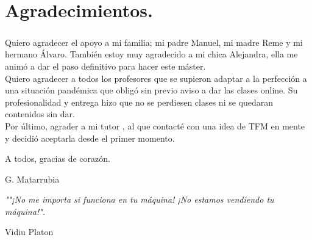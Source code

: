 \chapter{Agradecimientos.}\label{sec:agradecimientos}

\paragraph{}Quiero agradecer el apoyo a mi familia; mi padre Manuel, mi madre Reme y mi hermano Álvaro.
También estoy muy agradecido a mi chica Alejandra, ella me animó a dar el paso definitivo para hacer este
máster. \\
Quiero agradecer a todos los profesores que se supieron adaptar a la perfección a una situación
pandémica que obligó sin previo aviso a dar las clases online. Su profesionalidad y entrega hizo que no
se perdiesen clases ni se quedaran contenidos sin dar. \\
Por último, agrader a mi tutor \TUTOR, al que contacté con una idea de TFM en mente y decidió
aceptarla desde el primer momento.

A todos, gracias de corazón.


\begin{flushright}
G. Matarrubia
\end{flushright}

%
\vspace*{\fill}

\emph{""¡No me importa si funciona en tu máquina! ¡No estamos vendiendo tu máquina!".}

\begin{flushright}
	Vidiu Platon
\end{flushright}

\vspace*{\fill}
%

\cleardoublepage